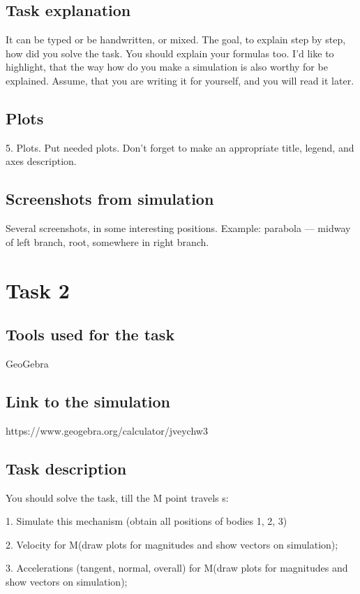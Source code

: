 \subsection{Task explanation}
It can be typed or be handwritten, or mixed. The goal, to explain step by step, how did
you solve the task. You should explain your formulas too.
I’d like to highlight, that the way how do you make a simulation is also worthy for be explained.
Assume, that you are writing it for yourself, and you will read it later.

\subsection{Plots}
5. Plots. Put needed plots. Don’t forget to make an appropriate title, legend, and axes description.
\subsection{Screenshots from simulation}

Several screenshots, in some interesting positions. Example: parabola —
midway of left branch, root, somewhere in right branch.


\section{Task 2}

\subsection{Tools used for the task}
GeoGebra

\subsection{Link to the simulation}
https://www.geogebra.org/calculator/jveychw3

\subsection{Task description}

You should solve the task, till the M point travels s:

1. Simulate this mechanism (obtain all positions of
bodies 1, 2, 3)

2. Velocity for M(draw plots for magnitudes and
show vectors on simulation);

3. Accelerations (tangent, normal, overall) for
M(draw plots for magnitudes and show vectors
on simulation);

